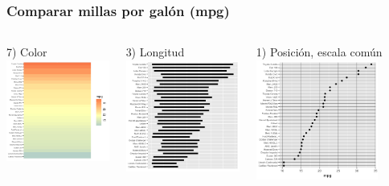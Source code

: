 \documentclass[9pt, spanish]{beamer}\usepackage[]{graphicx}\usepackage[]{color}
\begin{document}
\begin{frame}
\frametitle{Comparar millas por gal\'on (mpg)}
\begin{columns}
\begin{column}{4cm}
7) Color
\includegraphics[width=4cm]{color}
\end{column}
\begin{column}{4cm}
3) Longitud
\includegraphics[width=4cm]{lenght}
\end{column}
\begin{column}{4cm}
1) Posici\'on, escala com\'un
\includegraphics[width=4cm]{Scaled}
\end{column}
\end{columns}
\end{frame}
\end{document}
